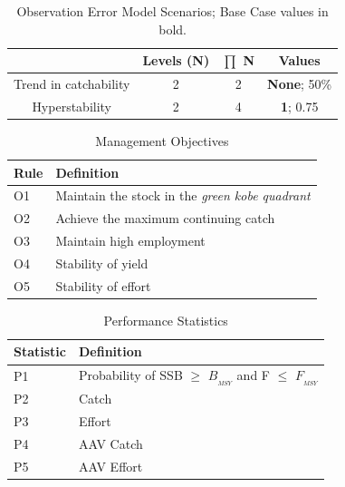 \documentclass[%
nonumbib,      %
%
]{nrc1}                          %
\begin{document}
\begin{table}
\label{tab:oem}
\caption{Observation Error Model Scenarios; Base Case values in bold.}  
\begin{center}
\label{tab:datasumm}
\begin{tabular}{|cccc|}
\hline
			& {\tiny Levels (N)} & {\tiny $\prod$ N} & {\tiny Values} \\ 
\hline\hline
{\tiny Trend in catchability } & {\tiny 2} 	 & {\tiny   2}  & {\tiny  \textbf{None}; 50\%}   \\
{\tiny Hyperstability}	       & {\tiny 2} 	 & {\tiny   4}  & {\tiny  \textbf{1}; 0.75}     \\
\hline
\end{tabular}
\end{center}
\end{table}


\begin{table}[h!]
  \label{tab:objectives}
  \caption{Management Objectives}  
  \begin{center}
    \begin{tabular}{ l p{10cm} }
    \hline
    Rule & Definition \\
    \hline 
     O1   & Maintain the stock in the \emph{green kobe quadrant}\\
     O2   & Achieve the maximum continuing catch \\
     O3   & Maintain high employment \\
     O4   & Stability of yield \\
     O5   & Stability of effort \\
     \hline
    \end{tabular}
  \end{center}
\end{table}

\begin{table}[h!]
  \label{tab:measures}
  \caption{Performance Statistics}  
  \begin{center}
    \begin{tabular}{ l p{10cm} }
    \hline 
    Statistic & Definition \\ 
    \hline 
    P1   & Probability of SSB $\geq$ $B_{_{MSY}}$ and F $\le$  $F_{_{MSY}}$ \\ 
    P2   & Catch\\ 
    P3   & Effort\\ 
    P4   & AAV Catch  \\ 
    P5   & AAV Effort  \\ 
    \hline 
    \end{tabular}
  \end{center}
\end{table}
\end{document}
